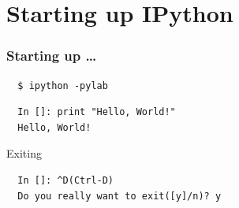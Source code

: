 \documentclass[14pt,compress]{beamer}
\begin{document}

\section{Starting up IPython}
\begin{frame}[fragile]
\frametitle{Starting up \ldots}
\begin{block}{}
\begin{lstlisting}
  $ ipython -pylab
\end{lstlisting} %
\end{block}
\begin{lstlisting}     
  In []: print "Hello, World!"
  Hello, World!
\end{lstlisting}
Exiting
\begin{lstlisting}
  In []: ^D(Ctrl-D)
  Do you really want to exit([y]/n)? y
\end{lstlisting}
\end{frame}

\end{document}
